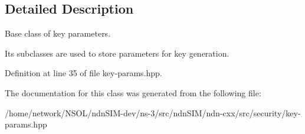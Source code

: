 \subsection{Detailed Description}
Base class of key parameters. 

Its subclasses are used to store parameters for key generation. 

Definition at line 35 of file key-\/params.\+hpp.



The documentation for this class was generated from the following file\+:\begin{DoxyCompactItemize}
\item 
/home/network/\+N\+S\+O\+L/ndn\+S\+I\+M-\/dev/ns-\/3/src/ndn\+S\+I\+M/ndn-\/cxx/src/security/key-\/params.\+hpp\end{DoxyCompactItemize}
